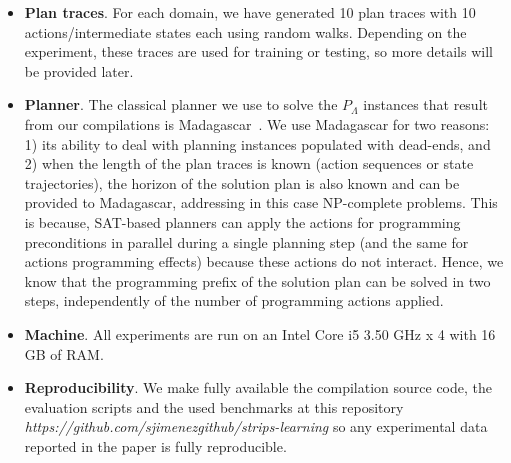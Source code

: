 \begin{itemize}

\item {\bf Plan traces}. For each domain, we have generated 10 plan traces with 10 actions/intermediate states each using random walks. Depending on the experiment, these traces are used for training or testing, so more details will be provided later.

\item {\bf Planner}. The classical planner we use to solve the $P_\Lambda$ instances that result from our compilations is {\sc Madagascar}~\cite{rintanen2014madagascar}. We use {\sc Madagascar} for two reasons: 1) its ability to deal with planning instances populated with dead-ends, and 2) when the length of the plan traces is known (\FO action sequences or \FO state trajectories), the horizon of the solution plan is also known and can be provided to {\sc Madagascar}, addressing in this case NP-complete problems. This is because, SAT-based planners can apply the actions for programming preconditions in parallel during a single planning step (and the same for actions programming effects) because these actions do not interact. Hence, we know that the programming prefix of the solution plan can be solved in two steps, independently of the number of programming actions applied.

\item {\bf Machine}. All experiments are run on an Intel Core i5 3.50 GHz x 4 with 16 GB of RAM.

\item {\bf Reproducibility}. We make fully available the compilation source code, the evaluation scripts and the used benchmarks at this repository {\em https://github.com/sjimenezgithub/strips-learning} so any experimental data reported in the paper is fully reproducible.
\end{itemize}

